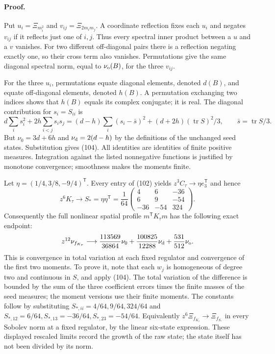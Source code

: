 \documentclass[11pt]{article}
\newcommand{\tr}{\operatorname{tr}}
\begin{document}
\paragraph{Proof.}
Put $u_i=\Xi_{m_i^2}$ and $v_{ij}=\Xi_{2m_im_j}$.
A coordinate reflection fixes each $u_i$ and negates $v_{ij}$ if it
reflects just one of $i,j$. Thus every spectral inner product between
a $u$ and a $v$ vanishes. For two different off-diagonal pairs there
is a reflection negating exactly one, so their cross term also vanishes.
Permutations give the same diagonal spectral norm, equal to $\nu_{\rm o}(B)$,
for the three $v_{ij}$.

For the three $u_i$, permutations equate diagonal elements, denoted
$d(B)$, and equate off-diagonal elements, denoted $h(B)$.
A permutation exchanging two indices shows that $h(B)$ equals its
complex conjugate; it is real. The diagonal contribution for $s_i=S_{ii}$
is
\[
 d\sum_i s_i^2+2h\sum_{i<j}s_is_j
 =(d-h)\sum_i(s_i-\bar s)^2+(d+2h)(\tr S)^2/3,
 \qquad\bar s=\tr S/3.
\]
But $\nu_0=3d+6h$ and $\nu_{\rm d}=2(d-h)$ by the definitions of the
unchanged seed states. Substitution gives (104).
All identities are identities of finite positive measures. Integration
against the listed nonnegative functions is justified by monotone
convergence; smoothness makes the moments finite.



Let $\eta=(1/4,3/8,-9/4)^{\mathsf T}$.
Every entry of (102) yields
$z^3C_\tau\to\eta e_3^{\mathsf T}$ and hence
\[
 z^6K_\tau\longrightarrow S_*=\eta\eta^{\mathsf T}
 =\frac1{64}\begin{pmatrix}4&6&-36\\6&9&-54\\-36&-54&324\end{pmatrix}.
\]
Consequently the full nonlinear spatial profile
$m^{\mathsf T}K_\tau m$ has the following exact endpoint:
\begin{equation}\label{eq:fabel-tensor-limit-measure}
 z^{12}\nu_{f_{K_\tau}}\longrightarrow
 \frac{113569}{36864}\nu_0+
 \frac{100825}{12288}\nu_{\rm d}+
 \frac{531}{512}\nu_{\rm o}.
\end{equation}
This is convergence in total variation at each fixed regulator and
convergence of the first two moments. To prove it, note that each
$w_j$ is homogeneous of degree two and continuous in $S$, and apply
(104). The total variation of the difference
is bounded by the sum of the three coefficient errors times the finite
masses of the seed measures; the moment versions use their finite moments.
The constants follow by substituting $S_{*,ii}=4/64,9/64,324/64$ and
$S_{*,12}=6/64,S_{*,13}=-36/64,S_{*,23}=-54/64$.
Equivalently $z^6\Xi_{f_{K_\tau}}\to\Xi_{f_{S_*}}$ in every Sobolev norm
at a fixed regulator, by the linear six-state expression.
These displayed rescaled limits record the growth of the raw state;
the state itself has not been divided by its norm.
\end{document}
